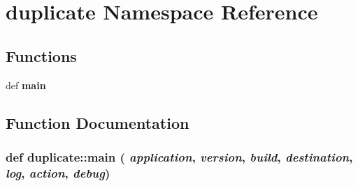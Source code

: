 \section{duplicate Namespace Reference}
\label{namespaceduplicate}


\subsection*{Functions}
\begin{CompactItemize}
\item 
def {\bf main}
\end{CompactItemize}


\subsection{Function Documentation}
\subsubsection{\setlength{\rightskip}{0pt plus 5cm}def duplicate::main ( {\em application},  {\em version},  {\em build},  {\em destination},  {\em log},  {\em action},  {\em debug})}\label{namespaceduplicate_438752e8c76739ea1e7cb2b99f05a15b}


